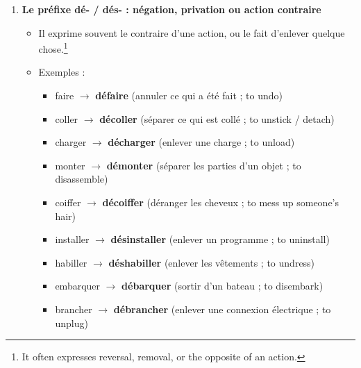 \documentclass[math,code]{amznotes}
\theoremstyle{remark}
\begin{document}
\begin{enumerate}
    \item \textbf{Le préfixe dé- / dés- : négation, privation ou action contraire}
    \begin{itemize}
        \item Il exprime souvent le contraire d'une action, ou le fait d'enlever quelque chose.\footnote{It often expresses reversal, removal, or the opposite of an action.}
        \item Exemples :
        \begin{itemize}
            \item faire $\rightarrow$ \textbf{défaire} (annuler ce qui a été fait ; to undo)
            \item coller $\rightarrow$ \textbf{décoller} (séparer ce qui est collé ; to unstick / detach)
            \item charger $\rightarrow$ \textbf{décharger} (enlever une charge ; to unload)
            \item monter $\rightarrow$ \textbf{démonter} (séparer les parties d'un objet ; to disassemble)
            \item coiffer $\rightarrow$ \textbf{décoiffer} (déranger les cheveux ; to mess up someone's hair)
            \item installer $\rightarrow$ \textbf{désinstaller} (enlever un programme ; to uninstall)
            \item habiller $\rightarrow$ \textbf{déshabiller} (enlever les vêtements ; to undress)
            \item embarquer $\rightarrow$ \textbf{débarquer} (sortir d'un bateau ; to disembark)
            \item brancher $\rightarrow$ \textbf{débrancher} (enlever une connexion électrique ; to unplug)
        \end{itemize}
    \end{itemize}


\end{enumerate}
\end{document}
